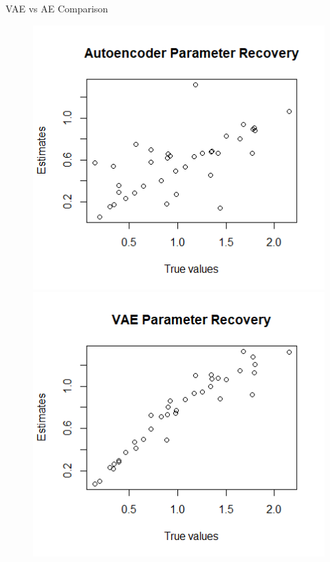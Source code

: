 \documentclass{beamer}
\theoremstyle{definition}
\begin{document}
\begin{frame}{VAE vs AE Comparison}
\begin{figure}[h!]
\includegraphics[width=\textwidth]{../img/aied_results/ae_a_corr.png}
\endminipage\hfill
{}
\includegraphics[width=\textwidth]{../img/aied_results/vae_a_corr.png}
\endminipage\hfill


\end{figure}
\end{frame}
\end{document}

